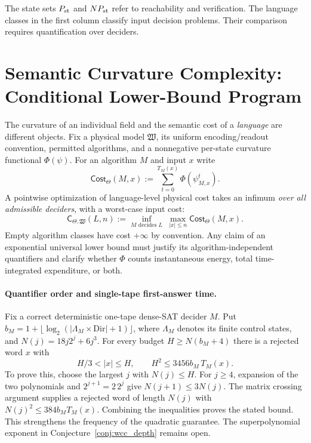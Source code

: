 \documentclass[12pt]{article}
\theoremstyle{remark}
\begin{document}
\noindent
The state sets $P_{\rm st}$ and $NP_{\rm st}$ refer to reachability and
verification. The language classes in the first column classify input
decision problems. Their comparison requires quantification over deciders.

















\section{Semantic Curvature Complexity: Conditional Lower-Bound Program}
\label{sec:curv-lower}
The curvature of an individual field and the semantic cost of a
\emph{language} are different objects. Fix a physical model
$\mathfrak W$, its uniform encoding/readout convention, permitted
algorithms, and a nonnegative per-state curvature functional
$\Phi(\psi)$. For an algorithm $M$ and input $x$ write
\[
\mathsf{Cost}_{\Theta}(M,x):=
\sum_{t=0}^{T_M(x)}\Phi(\psi_{M,x}^{t}).
\]
A pointwise optimization of language-level physical cost takes an infimum
\emph{over all admissible deciders}, with a worst-case input cost:
\[
\mathsf{C}_{\Theta,\mathfrak W}(L,n):=
\inf_{M\text{ decides }L}\ \max_{|x|\le n}
\mathsf{Cost}_{\Theta}(M,x).
\]
Empty algorithm classes have cost $+\infty$ by convention.
Any claim of an exponential universal lower bound must justify its
algorithm-independent quantifiers and clarify whether $\Phi$ counts
instantaneous energy, total time-integrated expenditure, or both.

\paragraph{Quantifier order and single-tape first-answer time.}
Fix a correct deterministic one-tape dense-SAT decider $M$. Put
$b_M=1+\lfloor\log_2(|\Lambda_M\times\mathrm{Dir}|+1)\rfloor$, where
$\Lambda_M$ denotes its finite control states, and
$N(j)=18j2^j+6j^3$. For every budget $H\ge N(b_M+4)$ there is a
rejected word $x$ with
\[
 H/3<|x|\le H,\qquad H^2\le 3456 b_M\,T_M(x).
\]
To prove this, choose the largest $j$ with $N(j)\le H$.
For $j\ge4$, expansion of the two polynomials and $2^{j+1}=2\,2^j$
give $N(j+1)\le3N(j)$. The matrix crossing argument supplies a rejected
word of length $N(j)$ with $N(j)^2\le384 b_M T_M(x)$. Combining the
inequalities proves the stated bound. This strengthens the frequency of
the quadratic guarantee. The superpolynomial exponent in
Conjecture~\ref{conj:wcc_depth} remains open.
\end{document}
